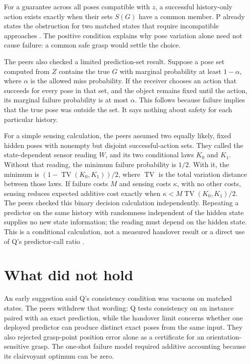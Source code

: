 \documentclass{article}
\begin{document}
For a guarantee across all poses compatible with \(z\), a successful history-only action exists exactly
when their sets \(S(G)\) have a common member. P already states the obstruction for two matched states
that require incompatible approaches \cite{P}. The positive condition explains why pose variation alone
need not cause failure: a common safe grasp would settle the choice.

The peers also checked a limited prediction-set result. Suppose a pose set computed from \(Z\) contains
the true \(G\) with marginal probability at least \(1-\alpha\), where \(\alpha\) is the allowed miss
probability. If the receiver chooses an action that succeeds for every pose in that set, and the object
remains fixed until the action, its marginal failure probability is at most \(\alpha\). This follows
because failure implies that the true pose was outside the set. It says nothing about safety for each
particular history.

For a simple sensing calculation, the peers assumed two equally likely, fixed hidden poses with nonempty
but disjoint successful-action sets. They called the state-dependent sensor reading \(W\), and its two
conditional laws \(K_0\) and \(K_1\). Without that reading, the minimum failure probability is \(1/2\).
With it, the minimum is \((1-\operatorname{TV}(K_0,K_1))/2\), where \(\operatorname{TV}\) is the total
variation distance between those laws. If failure costs \(M\) and sensing costs \(\kappa\), with no other
costs, sensing reduces expected additive cost exactly when \(\kappa<M\operatorname{TV}(K_0,K_1)/2\). The
peers checked this binary decision calculation independently. Repeating a predictor on the same history
with randomness independent of the hidden state supplies no new state information; the reading must
depend on the hidden state. This is a conditional
calculation, not a measured handover result or a direct use of Q's predictor-call ratio \cite{Q}.

\section{What did not hold}

An early suggestion said Q's consistency condition was vacuous on matched states. The peers withdrew that
wording: Q tests consistency on an instance paired with an exact prediction, while the handover limit
concerns whether one deployed predictor can produce distinct exact poses from the same input. They also
rejected grasp-point position error alone as a certificate for an orientation-sensitive grasp. The
one-shot failure model required additive accounting because its clairvoyant optimum can be zero.
\end{document}
